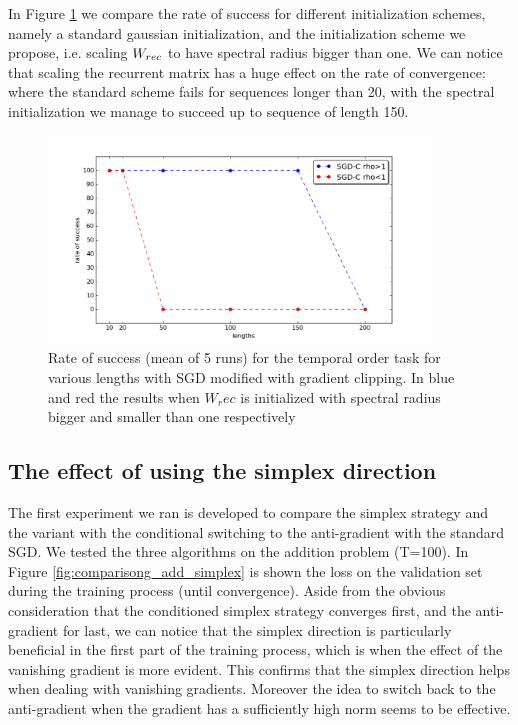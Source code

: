 In Figure \ref{fig:temporal_rates} we compare the rate of success for different initialization schemes, namely a standard gaussian initialization, and the initialization scheme we propose, i.e. scaling $W_{rec}$ to have spectral radius bigger than one. We can notice that scaling the recurrent matrix has a huge effect on the rate of convergence: where the standard scheme fails for sequences longer than 20, with the spectral initialization we manage to succeed up to sequence of length 150.


\begin{figure}
	\centering
	\includegraphics[width= 0.9\textwidth]{chapter4/temporal_rates.png}
	\caption{Rate of success (mean of 5 runs) for the temporal order task for various lengths with SGD modified with gradient clipping. In blue and red the results when $W_rec$ is initialized with spectral radius bigger and smaller than one respectively}
	\label{fig:temporal_rates}
\end{figure}



\subsection{The effect of using the simplex direction}
The first experiment we ran is developed to compare the simplex strategy and the variant with the conditional switching to the anti-gradient with the standard SGD. We tested the three algorithms on the addition problem (T=100). In Figure \ref{fig:comparisong_add_simplex} is shown the loss on the validation set during the training process (until convergence). Aside from the obvious consideration that the conditioned simplex strategy converges first, and the anti-gradient for last, we can notice that the simplex direction is particularly beneficial in the first part of the training process, which is when the effect of the vanishing gradient is more evident. This confirms that the simplex direction helps when dealing with vanishing gradients. Moreover the idea to switch back to the anti-gradient when the gradient has a sufficiently high norm seems to be effective.

